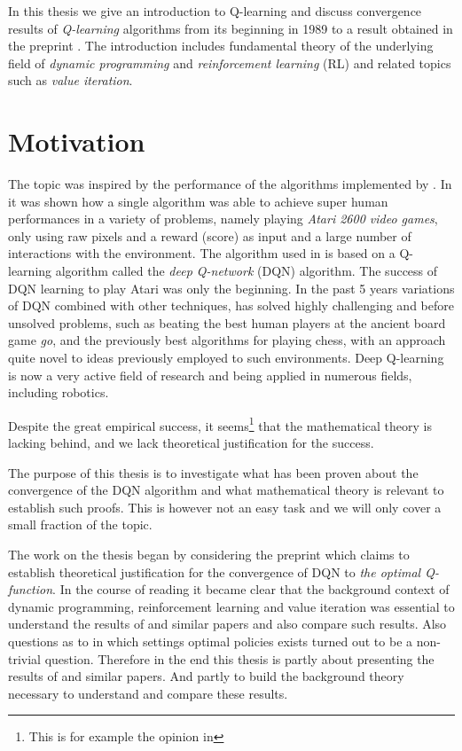 In this thesis we give an introduction to Q-learning and discuss
convergence results of \emph{Q-learning} algorithms from its beginning in
1989  to a result obtained in the preprint .
The introduction includes fundamental theory of the underlying field of
\emph{dynamic programming} and \emph{reinforcement learning} (RL)
and related topics such as \emph{value iteration}.

\section{Motivation}
The topic was inspired by the performance of the algorithms
implemented by .
In  it was shown how a single algorithm was able to achieve super
human performances in a variety of problems, namely playing
\emph{Atari 2600 video games},
only using raw pixels and a reward (score) as input and a large number of
interactions with the environment.
The algorithm used in  is based on a Q-learning
algorithm called the \emph{deep Q-network} (DQN) algorithm.
The success of DQN learning to play Atari was only the beginning.
In the past 5 years variations of DQN combined with other techniques,
has solved highly challenging and before unsolved problems,
such as beating the best human players at the ancient board game \emph{go},
and the previously best algorithms for playing chess, with an approach
quite novel to ideas previously employed to such environments.
Deep Q-learning is now a very active field of research and
being applied in numerous fields, including robotics.

Despite the great empirical success, it
seems\footnote{This is for example the opinion in }
that the mathematical theory is lacking behind,
and we lack theoretical justification for the success.

The purpose of this thesis is
to investigate what has been proven
about the convergence of the DQN algorithm
and what mathematical theory is relevant to establish such proofs.
This is however not an easy task and we will only cover a small fraction
of the topic.

The work on the thesis began by considering the preprint
 which claims to establish theoretical justification for
the convergence of DQN to \emph{the optimal Q-function}.
In the course of reading  it became clear that the background
context of dynamic programming, reinforcement learning and value iteration
was essential to understand the results of  and similar papers
and also compare such results.
Also questions as to in which settings optimal policies exists turned out
to be a non-trivial question.
Therefore in the end this thesis is partly about presenting the results of
 and similar papers.
And partly to build the background theory necessary to understand and
compare these results.

